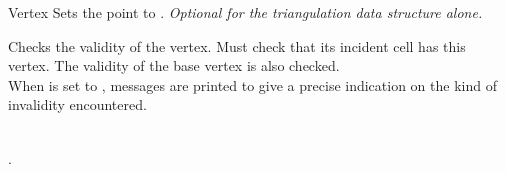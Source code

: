 \begin{ccRefConcept}[TriangulationDataStructure::]{Vertex}
{Sets the point to . {\textit{Optional for the
triangulation data structure alone.}}}

\begin{ccDebug}


{Checks the validity of the vertex. Must check that its incident cell
has this vertex. The validity of the base vertex is also checked.\\
When  is set to , messages are printed to give
a precise indication on the kind of invalidity encountered.}
\end{ccDebug}

\ccSeeAlso

\\
.

\end{ccRefConcept}